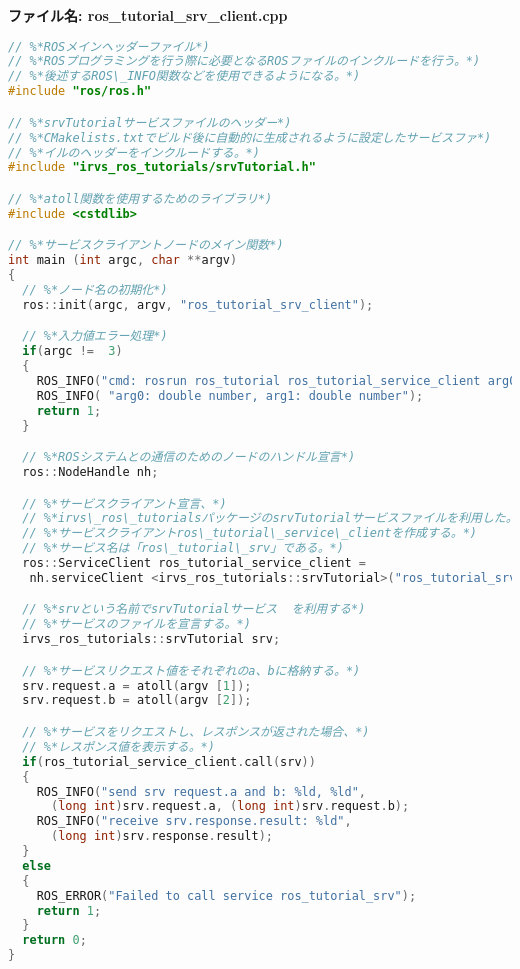 \noindent\textbf{ファイル名: ros\_tutorial\_srv\_client.cpp}
\begin{lstlisting}[language=C++]
// %*ROSメインヘッダーファイル*)
// %*ROSプログラミングを行う際に必要となるROSファイルのインクルードを行う。*)
// %*後述するROS\_INFO関数などを使用できるようになる。*)
#include "ros/ros.h"

// %*srvTutorialサービスファイルのヘッダー*)
// %*CMakelists.txtでビルド後に自動的に生成されるように設定したサービスファ*)
// %*イルのヘッダーをインクルードする。*)
#include "irvs_ros_tutorials/srvTutorial.h"

// %*atoll関数を使用するためのライブラリ*)
#include <cstdlib>

// %*サービスクライアントノードのメイン関数*)
int main (int argc, char **argv)
{
  // %*ノード名の初期化*)
  ros::init(argc, argv, "ros_tutorial_srv_client");

  // %*入力値エラー処理*)
  if(argc !=  3)
  {
    ROS_INFO("cmd: rosrun ros_tutorial ros_tutorial_service_client arg0 arg1");
    ROS_INFO( "arg0: double number, arg1: double number");
    return 1;
  }

  // %*ROSシステムとの通信のためのノードのハンドル宣言*)
  ros::NodeHandle nh;

  // %*サービスクライアント宣言、*)
  // %*irvs\_ros\_tutorialsパッケージのsrvTutorialサービスファイルを利用した。*)
  // %*サービスクライアントros\_tutorial\_service\_clientを作成する。*)
  // %*サービス名は「ros\_tutorial\_srv」である。*)
  ros::ServiceClient ros_tutorial_service_client =
   nh.serviceClient <irvs_ros_tutorials::srvTutorial>("ros_tutorial_srv");

  // %*srvという名前でsrvTutorialサービス  を利用する*)
  // %*サービスのファイルを宣言する。*)
  irvs_ros_tutorials::srvTutorial srv;

  // %*サービスリクエスト値をそれぞれのa、bに格納する。*)
  srv.request.a = atoll(argv [1]);
  srv.request.b = atoll(argv [2]);

  // %*サービスをリクエストし、レスポンスが返された場合、*)
  // %*レスポンス値を表示する。*)
  if(ros_tutorial_service_client.call(srv))
  {
    ROS_INFO("send srv request.a and b: %ld, %ld",
      (long int)srv.request.a, (long int)srv.request.b);
    ROS_INFO("receive srv.response.result: %ld",
      (long int)srv.response.result);
  }
  else
  {
    ROS_ERROR("Failed to call service ros_tutorial_srv");
    return 1;
  }
  return 0;
}
\end{lstlisting}

